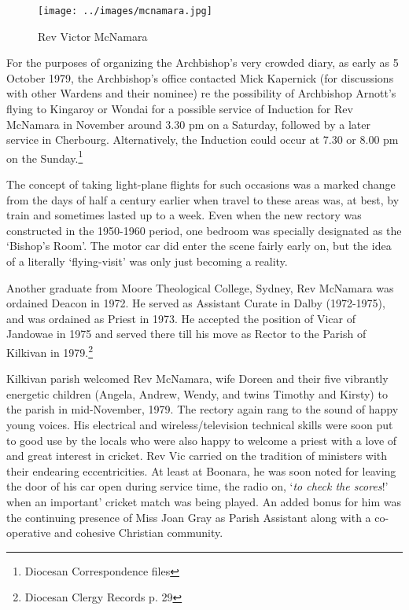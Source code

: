 \begin{figure}
\begin{center}
\texttt{[image: ../images/mcnamara.jpg]}
\caption{Rev Victor McNamara}
\end{center}
\end{figure}




For the purposes of organizing the Archbishop's very crowded diary, as early as 5 October 1979, the Archbishop's office contacted Mick Kapernick (for discussions with other Wardens and their nominee) re the possibility of Archbishop Arnott's flying to Kingaroy or Wondai for a possible service of Induction for Rev McNamara in November around 3.30 pm on a Saturday, followed by a later service in Cherbourg. Alternatively, the Induction could occur at 7.30 or 8.00 pm on the Sunday.\footnote{Diocesan Correspondence files}


The concept of taking light-plane flights for such occasions was a marked change from the days of half a century earlier when travel to these areas was, at best, by train and sometimes lasted up to a week. Even when the new rectory was constructed in the 1950-1960 period, one bedroom was specially designated as the `Bishop's Room'. The motor car did enter the scene fairly early on, but the idea of a literally `flying-visit' was only just becoming a reality.



Another graduate from Moore Theological College, Sydney, Rev McNamara was ordained Deacon in 1972. He served as Assistant Curate in Dalby (1972-1975), and was ordained as Priest in 1973. He accepted the position of Vicar of Jandowae in 1975 and served there till his move as Rector to the Parish of Kilkivan in 1979.\footnote{Diocesan Clergy Records p. 29}


Kilkivan parish welcomed Rev McNamara, wife Doreen and their five vibrantly energetic children (Angela, Andrew, Wendy, and twins Timothy and Kirsty) to the parish in mid-November, 1979. The rectory again rang to the sound of happy young voices. His electrical and wireless/television technical skills were soon put to good use by the locals who were also happy to welcome a priest with a love of and great interest in cricket. Rev Vic carried on the tradition of ministers with their endearing eccentricities. At least at Boonara, he was soon noted for leaving the door of his car open during service time, the radio on, `\emph{to check the scores}!' when an important' cricket match was being played. An added bonus for him was the continuing presence of Miss Joan Gray as Parish Assistant along with a co-operative and cohesive Christian community.




